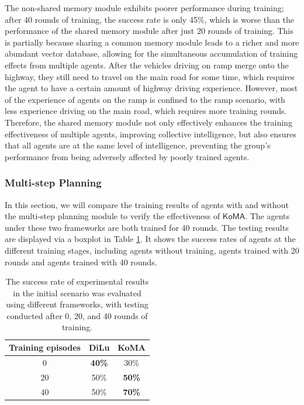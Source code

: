 \documentclass[lettersize,journal]{IEEEtran}
\begin{document}
The non-shared memory module exhibits poorer performance during training; after 40 rounds of training, the success rate is only 45\%, which is worse than the performance of the shared memory module after just 20 rounds of training. This is partially because sharing a common memory module leads to a richer and more abundant vector database, allowing for the simultaneous accumulation of training effects from multiple agents. After the vehicles driving on ramp merge onto the highway, they still need to travel on the main road for some time, which requires the agent to have a certain amount of highway driving experience. However, most of the experience of agents on the ramp is confined to the ramp scenario, with less experience driving on the main road, which requires more training rounds. Therefore, the shared memory module not only effectively enhances the training effectiveness of multiple agents, improving collective intelligence, but also ensures that all agents are at the same level of intelligence, preventing the group's performance from being adversely affected by poorly trained agents.

\subsubsection{Multi-step Planning}
In this section, we will compare the training results of agents with and without the multi-step planning module to verify the effectiveness of $\mathsf{KoMA}$. The agents under these two frameworks are both trained for 40 rounds. The testing results are displayed via a boxplot in Table \ref{tab:table3}. It shows the success rates of agents at the different training stages, including agents without training, agents trained with 20 rounds and agents trained with 40 rounds. 

\begin{table}[h]
\caption{The success rate of experimental results in the initial scenario was evaluated using different frameworks, with testing conducted after 0, 20, and 40 rounds of training.\label{tab:table3}}
\centering
\begin{tabular}{|c||c||c|}
\hline
\textbf{Training episodes} & \textbf{DiLu} & \textbf{KoMA}\\
\hline
0 & \textbf{40\%} & 30\%\\
\hline
20 & 50\% & \textbf{50\%}\\
\hline
40 & 50\% & \textbf{70\%}\\
\hline
\end{tabular}
\end{table}
\end{document}
